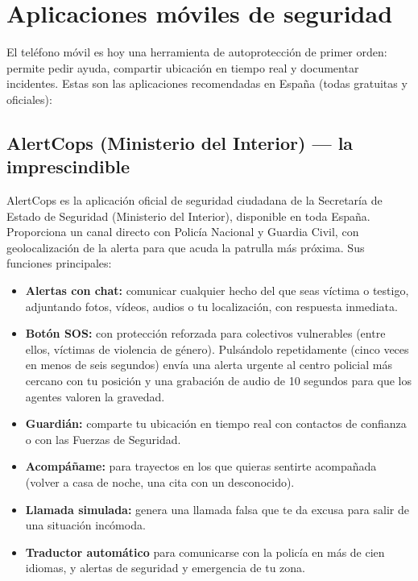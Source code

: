 \chapter{Aplicaciones móviles de seguridad}

El teléfono móvil es hoy una herramienta de autoprotección de primer orden: permite pedir ayuda, compartir ubicación en tiempo real y documentar incidentes. Estas son las aplicaciones recomendadas en España (todas gratuitas y oficiales):

\section{AlertCops (Ministerio del Interior) --- la imprescindible}

AlertCops es la aplicación oficial de seguridad ciudadana de la Secretaría de Estado de Seguridad (Ministerio del Interior), disponible en toda España. Proporciona un canal directo con Policía Nacional y Guardia Civil, con geolocalización de la alerta para que acuda la patrulla más próxima. Sus funciones principales:

\begin{itemize}
  \item \textbf{Alertas con chat:} comunicar cualquier hecho del que seas víctima o testigo, adjuntando fotos, vídeos, audios o tu localización, con respuesta inmediata.
  \item \textbf{Botón SOS:} con protección reforzada para colectivos vulnerables (entre ellos, víctimas de violencia de género). Pulsándolo repetidamente (cinco veces en menos de seis segundos) envía una alerta urgente al centro policial más cercano con tu posición y una grabación de audio de 10 segundos para que los agentes valoren la gravedad.
  \item \textbf{Guardián:} comparte tu ubicación en tiempo real con contactos de confianza o con las Fuerzas de Seguridad.
  \item \textbf{Acompáñame:} para trayectos en los que quieras sentirte acompañada (volver a casa de noche, una cita con un desconocido).
  \item \textbf{Llamada simulada:} genera una llamada falsa que te da excusa para salir de una situación incómoda.
  \item \textbf{Traductor automático} para comunicarse con la policía en más de cien idiomas, y alertas de seguridad y emergencia de tu zona.
\end{itemize}

